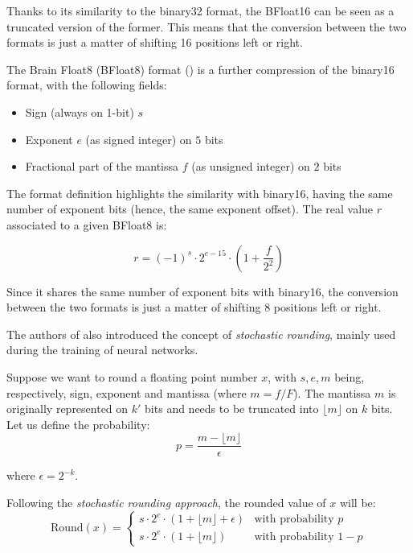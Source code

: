 Thanks to its similarity to the binary32 format, the BFloat16 can be seen as a truncated version of the former. This means that the conversion between the two formats is just a matter of shifting 16 positions left or right.

The Brain Float8 (BFloat8) format (\cite{naveen2019mixed}) is a further compression of the binary16 format, with the following fields:

\begin{itemize}
    \item Sign (always on 1-bit) $s$
    \item Exponent $e$ (as signed integer) on $5$ bits
    \item Fractional part of the mantissa $f$ (as unsigned integer) on $2$ bits
\end{itemize}

The format definition highlights the similarity with binary16, having the same number of exponent bits (hence, the same exponent offset). The real value $r$ associated to a given BFloat8 is:

\begin{equation}\label{eqn:bfloat82real}
    r = (-1)^s \cdot 2^{e-15} \cdot \left(1 + \frac{f}{2^2} \right)
\end{equation}

Since it shares the same number of exponent bits with binary16, the conversion between the two formats is just a matter of shifting 8 positions left or right.

The authors of \cite{naveen2019mixed} also introduced the concept of \textit{stochastic rounding}, mainly used during the training of neural networks.

Suppose we want to round a floating point number $x$, with $s,e,m$ being, respectively, sign, exponent and mantissa (where $m = f/F$). The mantissa $m$ is originally represented on $k'$ bits and needs to be truncated into $\lfloor m \rfloor$ on $k$ bits. Let us define the probability: 
\begin{equation}\label{eqn:bfloat8StochProb}
    p = \frac{m - \lfloor m \rfloor}{\epsilon}
\end{equation}

where $\epsilon = 2^{-k}$.

Following the \textit{stochastic rounding approach}, the rounded value of $x$ will be:
\begin{equation}\label{eqn:bfloat8Rounded}
\text{Round}(x) = 
\left\{\begin{matrix}
s \cdot 2^e \cdot ( 1 + \lfloor m \rfloor + \epsilon) & \text{with probability } p \\ 
s \cdot 2^e \cdot ( 1 + \lfloor m \rfloor) & \text{with probability } 1-p 
\end{matrix}\right.
\end{equation}

